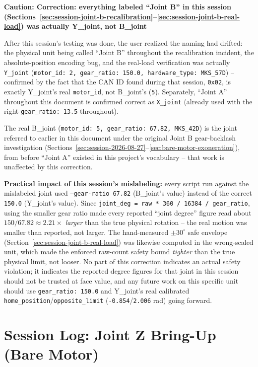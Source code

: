 \documentclass[11pt,letterpaper]{article}
\newenvironment{caution}[1]{%
    \par\addvspace{8pt}%
    \noindent{\color{cautionred}\rule{\linewidth}{0.8pt}}\par\vspace{2pt}
    \noindent\textbf{\color{cautionred}Caution: #1}\par\vspace{2pt}
}{%
    \par\vspace{2pt}\noindent{\color{cautionred}\rule{\linewidth}{0.4pt}}%
    \par\addvspace{8pt}%
}
\begin{document}
\begin{caution}{Correction: everything labeled ``Joint B'' in this session (Sections~\ref{sec:session-joint-b-recalibration}--\ref{sec:session-joint-b-real-load}) was actually Y\_joint, not B\_joint}
After this session's testing was done, the user realized the naming had drifted: the physical unit being called ``Joint B'' throughout the recalibration incident, the absolute-position encoding bug, and the real-load verification was actually \texttt{Y\_joint} (\texttt{motor\_id: 2, gear\_ratio: 150.0, hardware\_type: MKS\_57D}) -- confirmed by the fact that the CAN ID found during that session, \texttt{0x02}, is exactly Y\_joint's real \texttt{motor\_id}, not B\_joint's (\texttt{5}). Separately, ``Joint A'' throughout this document is confirmed correct as \texttt{X\_joint} (already used with the right \texttt{gear\_ratio: 13.5} throughout).

The real B\_joint (\texttt{motor\_id: 5, gear\_ratio: 67.82, MKS\_42D}) is the joint referred to earlier in this document under the original Joint B gear-backlash investigation (Sections~\ref{sec:session-2026-08-27}--\ref{sec:bare-motor-exoneration}), from before ``Joint A'' existed in this project's vocabulary -- that work is unaffected by this correction.

\textbf{Practical impact of this session's mislabeling:} every script run against the mislabeled joint used \texttt{--gear-ratio 67.82} (B\_joint's value) instead of the correct \texttt{150.0} (Y\_joint's value). Since \texttt{joint\_deg = raw \texttt{*} 360 / 16384 / gear\_ratio}, using the smaller gear ratio made every reported ``joint degree'' figure read about $150/67.82 \approx 2.21\times$ \emph{larger} than the true physical rotation -- the real motion was smaller than reported, not larger. The hand-measured $\pm 30^\circ$ safe envelope (Section~\ref{sec:session-joint-b-real-load}) was likewise computed in the wrong-scaled unit, which made the enforced raw-count safety bound \emph{tighter} than the true physical limit, not looser. No part of this correction indicates an actual safety violation; it indicates the reported degree figures for that joint in this session should not be trusted at face value, and any future work on this specific unit should use \texttt{gear\_ratio: 150.0} and Y\_joint's real calibrated \texttt{home\_position}/\texttt{opposite\_limit} (\texttt{-0.854}/\texttt{2.006} rad) going forward.
\end{caution}

\section{Session Log: Joint Z Bring-Up (Bare Motor)}
\label{sec:session-joint-z}
\end{document}
